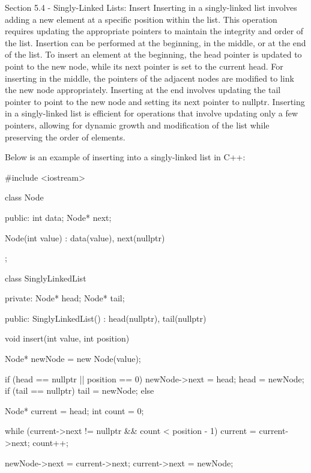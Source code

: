 \begin{notes}{Section 5.4 - Singly-Linked Lists: Insert}
    Inserting in a singly-linked list involves adding a new element at a specific position within the list. This operation requires updating the appropriate pointers to maintain the integrity and order of the list. Insertion can be performed at the 
    beginning, in the middle, or at the end of the list. To insert an element at the beginning, the head pointer is updated to point to the new node, while its next pointer is set to the current head. For inserting in the middle, the pointers of the 
    adjacent nodes are modified to link the new node appropriately. Inserting at the end involves updating the tail pointer to point to the new node and setting its next pointer to nullptr. Inserting in a singly-linked list is efficient for operations 
    that involve updating only a few pointers, allowing for dynamic growth and modification of the list while preserving the order of elements.
    
    \begin{highlight}
        Below is an example of inserting into a singly-linked list in C++:
    
    \begin{code}[C++]
    #include <iostream>

    class Node {
    public:
        int data;
        Node* next;
    
        Node(int value) : data(value), next(nullptr) {}
    };
    
    class SinglyLinkedList {
    private:
        Node* head;
        Node* tail;
    
    public:
        SinglyLinkedList() : head(nullptr), tail(nullptr) {}
    
        void insert(int value, int position) {
            Node* newNode = new Node(value);
    
            if (head == nullptr || position == 0) {
                newNode->next = head;
                head = newNode;
                if (tail == nullptr) {
                    tail = newNode;
                }
            } else {
                Node* current = head;
                int count = 0;
    
                while (current->next != nullptr && count < position - 1) {
                    current = current->next;
                    count++;
                }
    
                newNode->next = current->next;
                current->next = newNode;
    
}}}
\end{code}
\end{highlight}
\end{notes}
